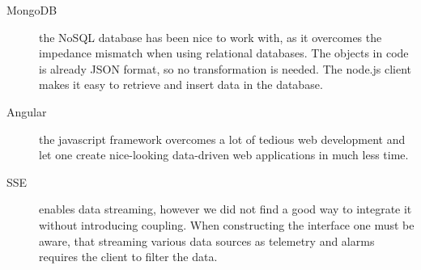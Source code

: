 \begin{description}
    \item[MongoDB] the NoSQL database has been nice to work with, as it overcomes the impedance mismatch when using relational databases. The objects in code is already JSON format, so no transformation is needed. The node.js client makes it easy to retrieve and insert data in the database.   
    \item[Angular] the javascript framework overcomes a lot of tedious web development and let one create nice-looking data-driven web applications in much less time.
    \item[SSE] enables data streaming, however we did not find a good way to integrate it without introducing coupling. When constructing the interface one must be aware, that streaming various data sources as telemetry and alarms requires the client to filter the data.
\end{description}